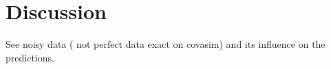 \section*{Discussion}

See noisy data ( not perfect data exact on covasim) and its influence on the predictions. 